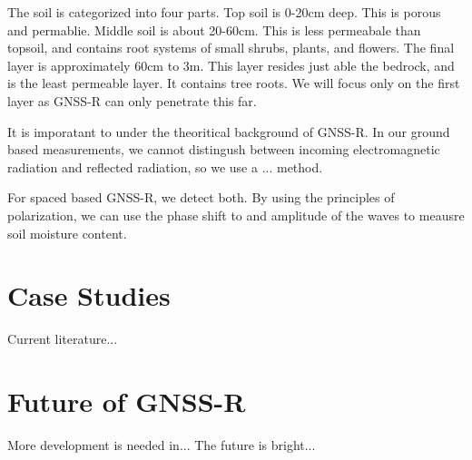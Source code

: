 \documentclass{article}
\begin{document}
The soil is categorized into four parts. Top soil is 0-20cm deep. This is porous and permablie. Middle soil is about 20-60cm. This is less permeabale than topsoil, and contains root systems of small shrubs, plants, and flowers. The final layer is approximately 60cm to 3m. This layer resides just able the bedrock, and is the least permeable layer. It contains tree roots. We will focus only on the first layer as GNSS-R can only penetrate this far. 

It is imporatant to under the theoritical background of GNSS-R. In our ground based measurements, we cannot distingush between incoming electromagnetic radiation and reflected radiation, so we use a ... method.

For spaced based GNSS-R, we detect both. By using the principles of polarization, we can use the phase shift to and amplitude of the waves to meausre soil moisture content. 
\section{Case Studies}
Current literature...

\section{Future of GNSS-R}
More development is needed in...
The future is bright...

\clearpage
\printbibliography
\end{document}
